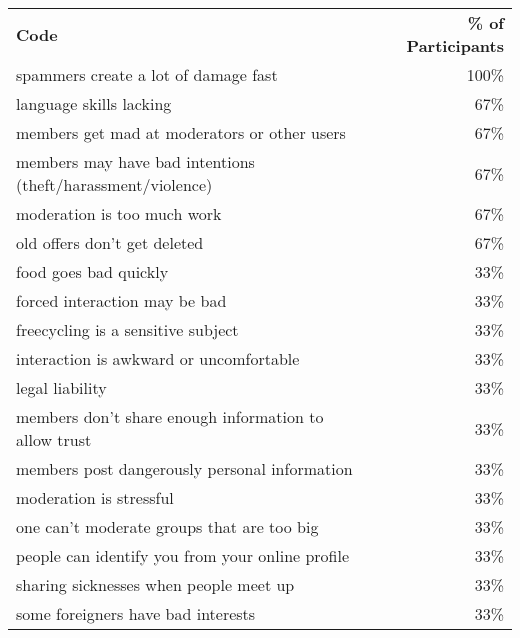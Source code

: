 \begin{longtable}{p{}r}
\textbf{Code}                                               & \textbf{\% of Participants} \\
spammers create a lot of damage fast                        & 100\%                       \\
language skills lacking                                     & 67\%                        \\
members get mad at moderators or other users                & 67\%                        \\
members may have bad intentions (theft/harassment/violence) & 67\%                        \\
moderation is too much work                                 & 67\%                        \\
old offers don't get deleted                                & 67\%                        \\
food goes bad quickly                                       & 33\%                        \\
forced interaction may be bad                               & 33\%                        \\
freecycling is a sensitive subject                          & 33\%                        \\
interaction is awkward or uncomfortable                     & 33\%                        \\
legal liability                                             & 33\%                        \\
members don't share enough information to allow trust       & 33\%                        \\
members post dangerously personal information               & 33\%                        \\
moderation is stressful                                     & 33\%                        \\
one can't moderate groups that are too big                  & 33\%                        \\
people can identify you from your online profile            & 33\%                        \\
sharing sicknesses when people meet up                      & 33\%                        \\
some foreigners have bad interests                          & 33\%
\end{longtable}

